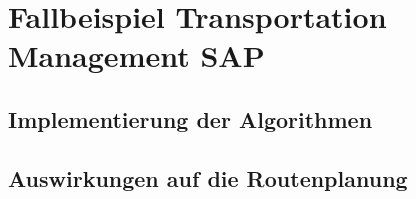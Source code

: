 \chapter{Fallbeispiel Transportation Management SAP}
\section{Implementierung der Algorithmen}
\section{Auswirkungen auf die Routenplanung}

